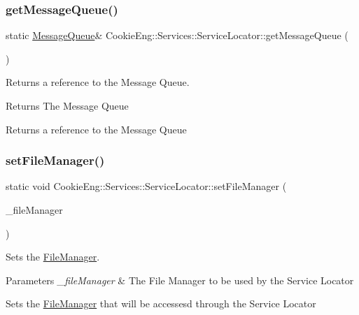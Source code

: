 \subsubsection{\texorpdfstring{get\+Message\+Queue()}{getMessageQueue()}}
{\footnotesize\ttfamily static \hyperlink{class_cookie_eng_1_1_services_1_1_message_queue}{Message\+Queue}\& Cookie\+Eng\+::\+Services\+::\+Service\+Locator\+::get\+Message\+Queue (\begin{DoxyParamCaption}{ }\end{DoxyParamCaption})\hspace{0.3cm}{\ttfamily [static]}}



Returns a reference to the Message Queue. 

\begin{DoxyReturn}{Returns}
The Message Queue
\end{DoxyReturn}
Returns a reference to the Message Queue \mbox{\label{class_cookie_eng_1_1_services_1_1_service_locator_a8a58e7b22845b4bf688cd98d2d78a72d}} 
\subsubsection{\texorpdfstring{set\+File\+Manager()}{setFileManager()}}
{\footnotesize\ttfamily static void Cookie\+Eng\+::\+Services\+::\+Service\+Locator\+::set\+File\+Manager (\begin{DoxyParamCaption}\item[{\hyperlink{class_cookie_eng_1_1_services_1_1_file_manager}{File\+Manager} $\ast$}]{\+\_\+file\+Manager }\end{DoxyParamCaption})\hspace{0.3cm}{\ttfamily [static]}}



Sets the \hyperlink{class_cookie_eng_1_1_services_1_1_file_manager}{File\+Manager}. 


\begin{DoxyParams}{Parameters}
{\em \+\_\+file\+Manager} & The File Manager to be used by the Service Locator\\
\hline
\end{DoxyParams}
Sets the \hyperlink{class_cookie_eng_1_1_services_1_1_file_manager}{File\+Manager} that will be accessesd through the Service Locator \mbox{\label{class_cookie_eng_1_1_services_1_1_service_locator_a49766d5e7cdca3f2384feb4258c9a155}} 
